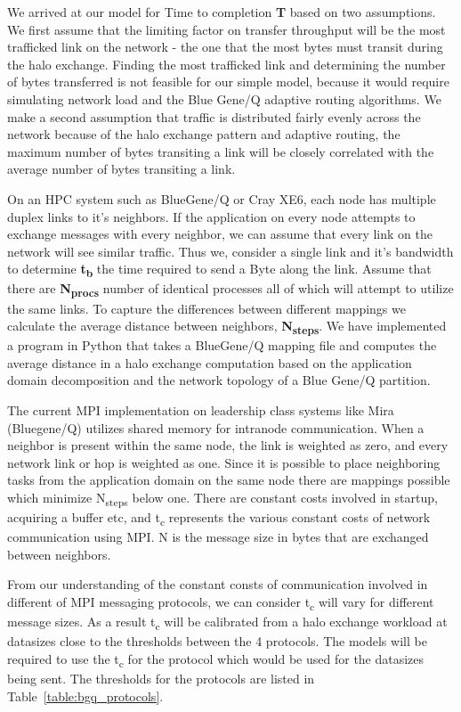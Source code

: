 \documentclass{acm_proc_article-sp}
\begin{document}
We arrived at our model for Time to completion \textbf{T} based on two assumptions.
We first assume that the limiting factor on transfer throughput will be
the most trafficked link on the network - the one that the most bytes
must transit during the halo exchange.  Finding the most trafficked
link and determining the number of bytes transferred is not feasible for our
simple model, because it would require simulating network load and
the Blue Gene/Q adaptive routing algorithms. We make a second assumption
that traffic is distributed fairly evenly across the network because of
the halo exchange pattern and adaptive routing, the maximum number of bytes
transiting a link will be closely correlated with the average number of bytes transiting a link.

On an HPC system such as BlueGene/Q or Cray XE6, each node has multiple duplex links to it's neighbors.
If the application on every node attempts to exchange messages with every neighbor, we can assume that
every link on the network will see similar traffic. Thus we, consider a single link and it's bandwidth
to determine \textbf{t\textsubscript{b}} the time required to send a Byte along the link.
Assume that there are \textbf{N\textsubscript{procs}} number of identical processes all of which will attempt to utilize the same links.
To capture the differences between different mappings we calculate the average distance between neighbors,
\textbf{N\textsubscript{steps}}. We have implemented a program in Python that
takes a BlueGene/Q mapping file and computes the average distance in
a halo exchange computation based on the application domain decomposition
and the network topology of a Blue Gene/Q partition.

The current MPI implementation on leadership class systems like Mira (Bluegene/Q) utilizes
shared memory for intranode communication. When a neighbor is present within the same node, the link
is weighted as zero, and every network link or hop is weighted as one. Since it is possible to place
neighboring tasks from the application domain on the same node there are mappings possible which
minimize N\textsubscript{steps} below one. There are constant costs involved in startup, acquiring a buffer etc,
and t\textsubscript{c} represents the various constant costs
of network communication using MPI.  N is the message size in bytes that are exchanged between neighbors.

From our understanding of the constant consts of communication involved in different of MPI messaging protocols,
we can consider t\textsubscript{c} will vary for different message sizes. As a result t\textsubscript{c} will
be calibrated from a halo exchange workload at datasizes close to the thresholds between the 4 protocols.
The models will be required to use the t\textsubscript{c} for the protocol which would be used for the datasizes
being sent. The thresholds for the protocols are listed in Table~\ref{table:bgq_protocols}.
\end{document}
